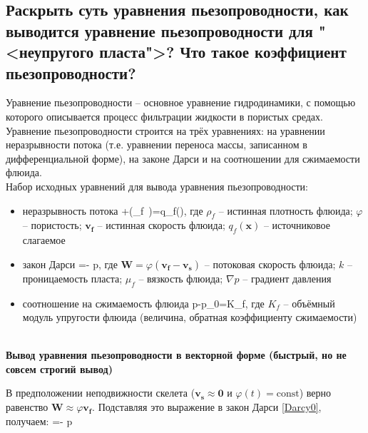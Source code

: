 

\subsection{Раскрыть суть уравнения пьезопроводности, как выводится уравнение пьезопроводности для "<неупругого пласта">? Что такое коэффициент пьезопроводности?}

Уравнение пьезопроводности -- основное уравнение гидродинамики, с помощью которого описывается процесс фильтрации жидкости в пористых средах.
\\

Уравнение пьезопроводности строится на трёх уравнениях: на уравнении неразрывности потока (т.е. уравнении переноса массы, записанном в дифференциальной форме), на законе Дарси и на соотношении для сжимаемости флюида.
\\

Набор исходных уравнений для вывода уравнения пьезопроводности:
\begin{itemize}
	\item неразрывность потока
	\beq\label{Continuity0}
	+\pmb{\nabla}\cdot\left(\rho_f\varphi \, \right)=q_f(),
	\eeq
	где $\rho_f$ -- истинная плотность флюида; $\varphi$ -- пористость; $\pmb{v_f}$ -- истинная скорость флюида; $q_f(\pmb{x})$ -- источниковое слагаемое
	\item закон Дарси
	\beq\label{Darcy0}
	=-\cdot\pmb{\nabla} p,
	\eeq
	где $\pmb{W}=\varphi\left(\pmb{v_f}-\pmb{v_s}\right)$ -- потоковая скорость флюида; $k$ -- проницаемость пласта; $\mu_f$ -- вязкость флюида; $\nabla p$ -- градиент давления
	\item соотношение на сжимаемость флюида
	\beq\label{Compressibility0}
	p-p_0=K_f,
	\eeq
	где $K_f$ -- объёмный модуль упругости флюида (величина, обратная коэффициенту сжимаемости)
\end{itemize}
\ \\

\textbf{Вывод уравнения пьезопроводности в векторной форме (быстрый, но не совсем строгий вывод)}

В предположении неподвижности скелета ($\pmb{v_s}\approx \pmb{0}$ и $\varphi(t)=\textrm{const}$) верно равенство $\pmb{W}\approx\varphi \pmb{v_f}$.
Подставляя это выражение в закон Дарси \eqref{Darcy0}, получаем:
\beq\label{DarcyWithSkeletNotMoving0}
\varphi {}=-\cdot\pmb{\nabla} p
\eeq

